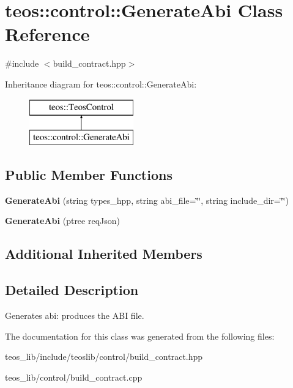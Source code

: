 \hypertarget{classteos_1_1control_1_1_generate_abi}{}\section{teos\+:\+:control\+:\+:Generate\+Abi Class Reference}
\label{classteos_1_1control_1_1_generate_abi}


{\ttfamily \#include $<$build\+\_\+contract.\+hpp$>$}

Inheritance diagram for teos\+:\+:control\+:\+:Generate\+Abi\+:\begin{figure}[H]
\begin{center}
\leavevmode
\includegraphics[height=2.000000cm]{classteos_1_1control_1_1_generate_abi}
\end{center}
\end{figure}
\subsection*{Public Member Functions}
\begin{DoxyCompactItemize}
\item 
\mbox{\label{classteos_1_1control_1_1_generate_abi_a3306abc2a6f87517aad41efd9ea4ca7e}} 
{\bfseries Generate\+Abi} (string types\+\_\+hpp, string abi\+\_\+file=\char`\"{}\char`\"{}, string include\+\_\+dir=\char`\"{}\char`\"{})
\item 
\mbox{\label{classteos_1_1control_1_1_generate_abi_ace9ac4a1154f562eb3bb00ff0bc92476}} 
{\bfseries Generate\+Abi} (ptree req\+Json)
\end{DoxyCompactItemize}
\subsection*{Additional Inherited Members}


\subsection{Detailed Description}
Generates abi\+: produces the A\+BI file. 

The documentation for this class was generated from the following files\+:\begin{DoxyCompactItemize}
\item 
teos\+\_\+lib/include/teoslib/control/build\+\_\+contract.\+hpp\item 
teos\+\_\+lib/control/build\+\_\+contract.\+cpp\end{DoxyCompactItemize}
